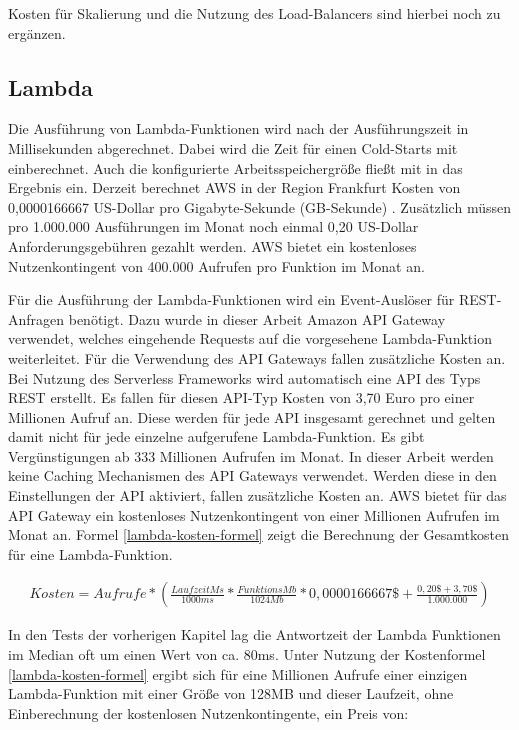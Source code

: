 \noindent
Kosten für Skalierung und die Nutzung des Load-Balancers sind hierbei noch zu ergänzen. 

\subsection{Lambda}
\label{subsec:kosten-lambda}
Die Ausführung von Lambda-Funktionen wird nach der Ausführungszeit in Millisekunden abgerechnet. Dabei wird die Zeit für einen Cold-Starts mit einberechnet. Auch die konfigurierte Arbeitsspeichergröße fließt mit in das Ergebnis ein. Derzeit berechnet AWS in der Region Frankfurt Kosten von 0,0000166667 US-Dollar pro Gigabyte-Sekunde (GB-Sekunde) \cite{noauthor_lambda_nodate}. Zusätzlich müssen pro 1.000.000 Ausführungen im Monat noch einmal 0,20 US-Dollar Anforderungsgebühren gezahlt werden. AWS bietet ein kostenloses Nutzenkontingent von 400.000 Aufrufen pro Funktion im Monat an.

Für die Ausführung der Lambda-Funktionen wird ein Event-Auslöser für REST-Anfragen benötigt. Dazu wurde in dieser Arbeit Amazon API Gateway verwendet, welches eingehende Requests auf die vorgesehene Lambda-Funktion weiterleitet. Für die Verwendung des API Gateways fallen zusätzliche Kosten an. Bei Nutzung des Serverless Frameworks wird automatisch eine API des Typs REST erstellt. Es fallen für diesen API-Typ Kosten von 3,70 Euro pro einer Millionen Aufruf an. Diese werden für jede API insgesamt gerechnet und gelten damit nicht für jede einzelne aufgerufene Lambda-Funktion. Es gibt Vergünstigungen ab 333 Millionen Aufrufen im Monat. In dieser Arbeit werden keine Caching Mechanismen des API Gateways verwendet. Werden diese in den Einstellungen der API aktiviert, fallen zusätzliche Kosten an. AWS bietet für das API Gateway ein kostenloses Nutzenkontingent von einer Millionen Aufrufen im Monat an\cite{noauthor_amazon_nodate}. Formel \ref{lambda-kosten-formel} zeigt die Berechnung der Gesamtkosten für eine Lambda-Funktion.

\begin{equation}
\begin{split}
Kosten = Aufrufe * \left(\frac{LaufzeitMs}{1000ms} * \frac{FunktionsMb}{1024Mb} * 0,0000166667\$ + \frac{0,20\$ + 3,70\$}{1.000.000}\right)
\end{split}
\label{lambda-kosten-formel}
\end{equation}

In den Tests der vorherigen Kapitel lag die Antwortzeit der Lambda Funktionen im Median oft um einen Wert von ca. 80ms. Unter Nutzung der Kostenformel \ref{lambda-kosten-formel} ergibt sich für eine Millionen Aufrufe einer einzigen Lambda-Funktion mit einer Größe von 128MB und dieser Laufzeit, ohne Einberechnung der kostenlosen Nutzenkontingente, ein Preis von: \\

